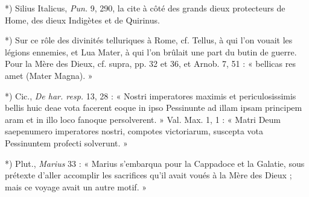 \documentclass[a4paper, 11pt, oneside, polutonikogreek, french]{article}
\begin{document}
*) Silius Italicus, \emph{Pun.} 9, 290, la cite à côté des grands dieux protecteurs de Home, des dieux Indigètes et de Quirinus.

*) Sur ce rôle des divinités telluriques à Rome, cf. Tellus, à qui l'on vouait les légions ennemies, et Lua Mater, à qui l'on brûlait une part du butin de guerre. Pour la Mère des Dieux, cf. supra, pp. 32 et 36, et Arnob. 7, 51 : « bellicas res amet (Mater Magna). »

*) Cic., \emph{De har. resp.} 13, 28 : « Nostri imperatores maximis et periculosissimis bellis huic deae vota facerent eoque in ipso Pessinunte ad illam ipsam principem aram et in illo loco fanoque persolverent. » Val. Max. 1, 1 : « Matri Deum saepenumero imperatores nostri, compotes victoriarum, suscepta vota Pessinuntem profecti solverunt. »

*) Plut., \emph{Marius} 33 : « Marius s'embarqua pour la Cappadoce et la Galatie, sous prétexte d'aller accomplir les sacrifices qu'il avait voués à la Mère des Dieux ; mais ce voyage avait un autre motif. »
\end{document}
